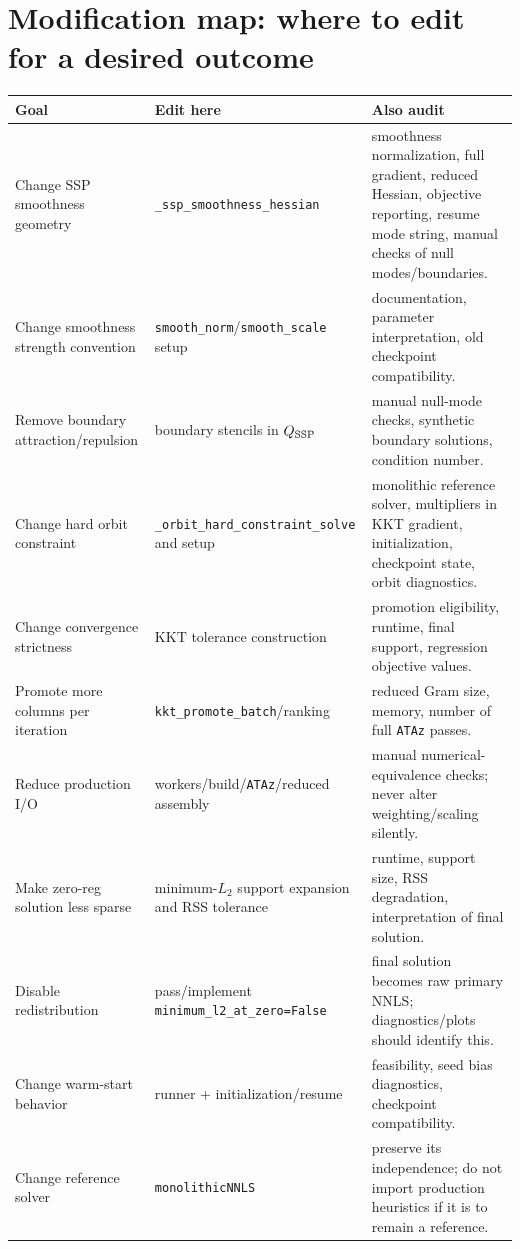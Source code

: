 \documentclass[10pt,a4paper]{article}
\newcommand{\code}[1]{\texttt{#1}}
\begin{document}
\section{Modification map: where to edit for a desired outcome}
\begin{longtable}{p{}p{}p{}}
\toprule
\textbf{Goal} & \textbf{Edit here} & \textbf{Also audit}\\
\midrule\endhead
Change SSP smoothness geometry & \code{\_ssp\_smoothness\_hessian} & smoothness normalization, full gradient, reduced Hessian, objective reporting, resume mode string, manual checks of null modes/boundaries.\\
Change smoothness strength convention & \code{smooth\_norm}/\code{smooth\_scale} setup & documentation, parameter interpretation, old checkpoint compatibility.\\
Remove boundary attraction/repulsion & boundary stencils in $Q_{\rm SSP}$ & manual null-mode checks, synthetic boundary solutions, condition number.\\
Change hard orbit constraint & \code{\_orbit\_hard\_constraint\_solve} and setup & monolithic reference solver, multipliers in KKT gradient, initialization, checkpoint state, orbit diagnostics.\\
Change convergence strictness & KKT tolerance construction & promotion eligibility, runtime, final support, regression objective values.\\
Promote more columns per iteration & \code{kkt\_promote\_batch}/ranking & reduced Gram size, memory, number of full \code{ATAz} passes.\\
Reduce production I/O & workers/build/\code{ATAz}/reduced assembly & manual numerical-equivalence checks; never alter weighting/scaling silently.\\
Make zero-reg solution less sparse & minimum-$L_2$ support expansion and RSS tolerance & runtime, support size, RSS degradation, interpretation of final solution.\\
Disable redistribution & pass/implement \code{minimum\_l2\_at\_zero=False} & final solution becomes raw primary NNLS; diagnostics/plots should identify this.\\
Change warm-start behavior & runner + initialization/resume & feasibility, seed bias diagnostics, checkpoint compatibility.\\
Change reference solver & \code{monolithicNNLS} & preserve its independence; do not import production heuristics if it is to remain a reference.\\
\bottomrule
\end{longtable}
\end{document}
